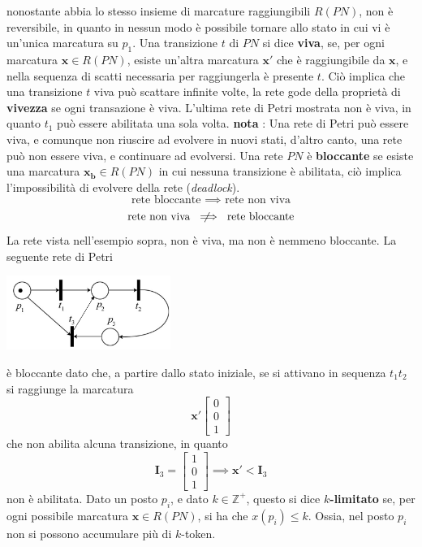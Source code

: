 \documentclass[10pt, letterpaper]{report}
\begin{document}
nonostante abbia lo stesso insieme di marcature raggiungibili $R(PN)$, non è reversibile, in quanto in nessun modo è possibile tornare allo stato in cui vi è un'unica marcatura su $p_1$.
\acc 
{} Una transizione $t$ di $PN$ si dice \textbf{viva}, se, per ogni marcatura $\mathbf{x}\in R(PN)$, esiste un'altra marcatura $\mathbf{x'}$ che è raggiungibile da $\mathbf{x}$, e nella sequenza di scatti necessaria per raggiungerla è presente $t$.\acc 
Ciò implica che una transizione $t$ viva può scattare infinite volte, la rete gode della proprietà di \textbf{vivezza} se ogni transazione è viva. L'ultima  rete di Petri mostrata non è viva, in quanto $t_1$ può essere abilitata una sola volta.\acc 
\textbf{nota} : Una rete di Petri può essere viva, e comunque non riuscire ad evolvere in nuovi stati, d'altro canto, una rete può non essere viva, e continuare ad evolversi.\acc 
{} Una rete $PN$ è \textbf{bloccante} se esiste una marcatura $\mathbf{x_b}\in R(PN)$ in cui nessuna transizione è abilitata, ciò implica l'impossibilità di evolvere della rete (\textit{deadlock}).
$$\text{ rete bloccante } \implies \text{ rete non viva } $$
$$\text{ rete non viva } \notimplies \text{ rete bloccante } $$
La rete vista nell'esempio sopra, non è viva, ma non è nemmeno bloccante. \acc 
La seguente rete di Petri
\begin{center}
    \includegraphics[width=0.4\textwidth]{images/bloccante.png}
\end{center}
è bloccante dato che, a partire dallo stato iniziale, se si attivano in sequenza $t_1t_2$ si raggiunge la marcatura 
$$\mathbf x' \begin{bmatrix}
    0\\0\\1
\end{bmatrix}$$ 
che non abilita alcuna transizione, in quanto $$\mathbf I_3=\begin{bmatrix}
    1\\ 0 \\ 1
\end{bmatrix}\implies \mathbf x' < \mathbf I_3$$
non è abilitata. 
\acc 
{} Dato un posto $p_i$, e dato $k\in\mathbb{Z^+}$, questo si dice $k$\textbf{-limitato} se, per ogni possibile marcatura $\mathbf x\in R(PN)$, si ha che $x(p_i)\le k$. Ossia, nel posto $p_i$ non si possono accumulare più di $k$-token.
\end{document}
